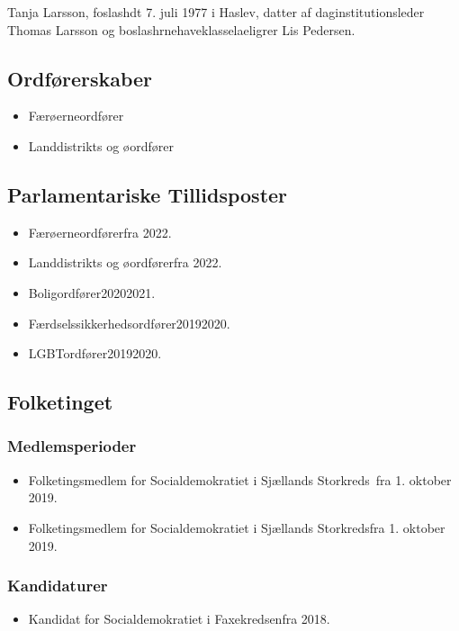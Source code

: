 \documentclass[11pt, a4paper]{awesome-cv}
\begin{document}
\makecvheader[R]
\makelettertitle
\begin{cvletter}
Tanja Larsson, foslashdt 7. juli 1977 i Haslev, datter af daginstitutionsleder Thomas Larsson og boslashrnehaveklasselaeligrer Lis Pedersen.

\subsection*{Ordførerskaber}
\begin{itemize}
\item Færøerneordfører
\item Landdistrikts og øordfører
\end{itemize}
\subsection*{Parlamentariske Tillidsposter}
\begin{itemize}
\item Færøerneordførerfra 2022.
\item Landdistrikts og øordførerfra 2022.
\item Boligordfører20202021.
\item Færdselssikkerhedsordfører20192020.
\item LGBTordfører20192020.
\end{itemize}
\subsection*{Folketinget}
\subsubsection*{Medlemsperioder}
\begin{itemize}
\item Folketingsmedlem for Socialdemokratiet i Sjællands Storkreds fra 1. oktober 2019.
\item Folketingsmedlem for Socialdemokratiet i Sjællands Storkredsfra 1. oktober 2019.
\end{itemize}
\subsubsection*{Kandidaturer}
\begin{itemize}
\item Kandidat for Socialdemokratiet i Faxekredsenfra 2018.
\end{itemize}
\end{cvletter}
\end{document}
